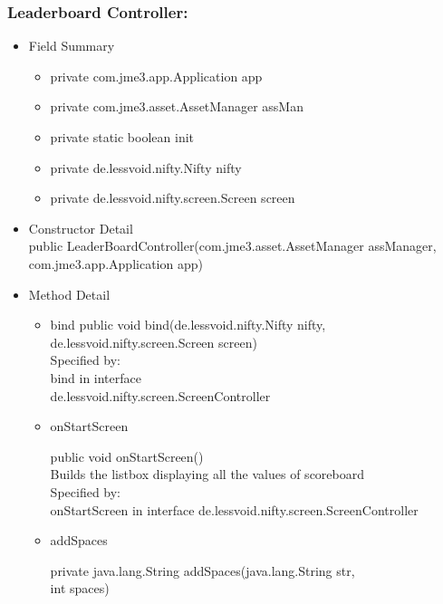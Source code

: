 \documentclass[letterpaper]{article}
\begin{document}
							\subsubsection*{Leaderboard Controller:}
						\vspace{0.1in}	
							\begin{itemize}
								\item	Field Summary
										\begin{itemize}
\item private com.jme3.app.Application 	app 
\item private com.jme3.asset.AssetManager 	assMan 
\item private static boolean 	init 
\item private de.lessvoid.nifty.Nifty 	nifty 
\item private de.lessvoid.nifty.screen.Screen 	screen 
		\end{itemize}
								\item	Constructor Detail \\
								public LeaderBoardController(com.jme3.asset.AssetManager assManager,\\
com.jme3.app.Application app) \\
								\item	Method Detail
										\begin{itemize}
						\item bind	
public void bind(de.lessvoid.nifty.Nifty nifty,\\
        de.lessvoid.nifty.screen.Screen screen) \\

Specified by: \\
    bind in interface \\ de.lessvoid.nifty.screen.ScreenController 
											\item
    onStartScreen

    public void onStartScreen() \\

    Builds the listbox displaying all the values of scoreboard \\

    Specified by: \\
        onStartScreen in interface de.lessvoid.nifty.screen.ScreenController

\item addSpaces

    private java.lang.String addSpaces(java.lang.String str,\\
                             int spaces) \\


\end{itemize}
\end{itemize}
\end{document}

